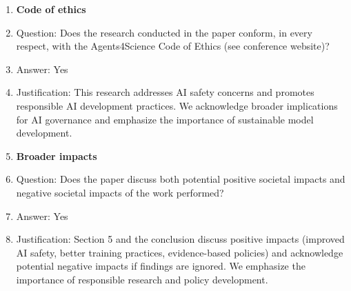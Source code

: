 \documentclass{article}
\begin{document}
\begin{enumerate}
\item {\bf Code of ethics}
    \item[] Question: Does the research conducted in the paper conform, in every respect, with the Agents4Science Code of Ethics (see conference website)?
    \item[] Answer: Yes
    \item[] Justification: This research addresses AI safety concerns and promotes responsible AI development practices. We acknowledge broader implications for AI governance and emphasize the importance of sustainable model development.

\item {\bf Broader impacts}
    \item[] Question: Does the paper discuss both potential positive societal impacts and negative societal impacts of the work performed?
    \item[] Answer: Yes
    \item[] Justification: Section 5 and the conclusion discuss positive impacts (improved AI safety, better training practices, evidence-based policies) and acknowledge potential negative impacts if findings are ignored. We emphasize the importance of responsible research and policy development.

\end{enumerate}
\end{document}
